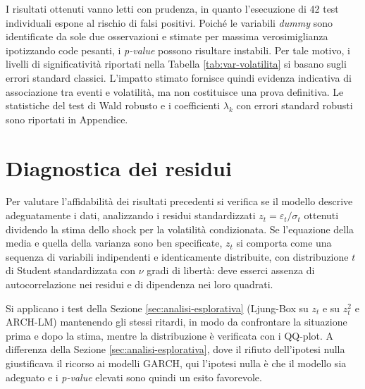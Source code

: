 I risultati ottenuti vanno letti con prudenza, in quanto l'esecuzione di 42 test individuali espone al rischio di falsi positivi. Poiché le variabili \emph{dummy} sono 
identificate da sole due osservazioni e stimate per massima verosimiglianza ipotizzando code pesanti, i \emph{p-value} possono risultare instabili. Per tale motivo, 
i livelli di significatività riportati nella Tabella \ref{tab:var-volatilita} si basano sugli errori standard classici. L'impatto stimato fornisce quindi evidenza 
indicativa di associazione tra eventi e volatilità, ma non costituisce una prova definitiva. Le statistiche del test di Wald robusto e i coefficienti $\lambda_k$ con errori 
standard robusti sono riportati in Appendice.


\section{Diagnostica dei residui}
\label{sec:diagnostica-residui}
Per valutare l'affidabilità dei risultati precedenti si verifica se il modello descrive adeguatamente i dati, analizzando i residui standardizzati $z_t = \varepsilon_t / \sigma_t$ ottenuti 
dividendo la stima dello shock per la volatilità condizionata. Se l'equazione della media e quella della varianza sono ben specificate, $z_t$ si comporta come una sequenza 
di variabili indipendenti e identicamente distribuite, con distribuzione $t$ di Student standardizzata con $\nu$ gradi di libertà: deve esserci assenza di autocorrelazione 
nei residui e di dipendenza nei loro quadrati. 

Si applicano i test della Sezione \ref{sec:analisi-esplorativa} (Ljung-Box su $z_t$ e su $z_t^2$ e ARCH-LM) mantenendo gli stessi ritardi, in modo da confrontare la 
situazione prima e dopo la stima, mentre la distribuzione è verificata con i QQ-plot. A differenza della Sezione \ref{sec:analisi-esplorativa}, dove il rifiuto dell'ipotesi 
nulla giustificava il ricorso ai modelli GARCH, qui l'ipotesi nulla è che il modello sia adeguato e i \emph{p-value} elevati sono quindi un esito favorevole.

